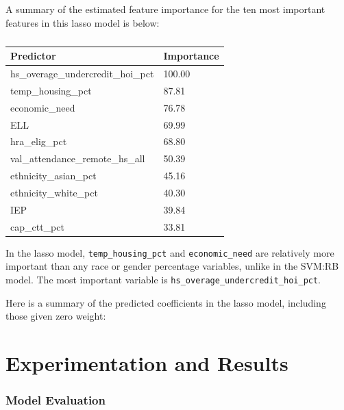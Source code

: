 \documentclass[
  man,floatsintext]{apa6}
\begin{document}
A summary of the estimated feature importance for the ten most important features in this lasso model is below:

\begin{table}[H]

\begin{center}
\begin{threeparttable}

\caption{\label{tab:unnamed-chunk-12}}

\begin{tabular}{ll}
\toprule
Predictor & \multicolumn{1}{c}{Importance}\\
\midrule
hs\_overage\_undercredit\_hoi\_pct & 100.00\\
temp\_housing\_pct & 87.81\\
economic\_need & 76.78\\
ELL & 69.99\\
hra\_elig\_pct & 68.80\\
val\_attendance\_remote\_hs\_all & 50.39\\
ethnicity\_asian\_pct & 45.16\\
ethnicity\_white\_pct & 40.30\\
IEP & 39.84\\
cap\_ctt\_pct & 33.81\\
\bottomrule
\end{tabular}

\end{threeparttable}
\end{center}

\end{table}

In the lasso model, \texttt{temp\_housing\_pct} and \texttt{economic\_need} are relatively more important than any race or gender percentage variables, unlike in the SVM:RB model. The most important variable is \texttt{hs\_overage\_undercredit\_hoi\_pct}.

Here is a summary of the predicted coefficients in the lasso model, including those given zero weight:

\hypertarget{experimentation-and-results}{%
\section{Experimentation and Results}\label{experimentation-and-results}}

\hypertarget{model-evaluation}{%
\subsubsection{Model Evaluation}\label{model-evaluation}}
\end{document}
